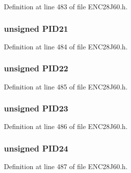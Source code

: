 Definition at line 483 of file E\+N\+C28\+J60.\+h.

\hypertarget{union_p_h_y_r_e_g_af9df143eb7a34477460b417fd088c89c}{}
\subsubsection[{P\+I\+D21}]{\setlength{\rightskip}{0pt plus 5cm}unsigned P\+I\+D21}\label{union_p_h_y_r_e_g_af9df143eb7a34477460b417fd088c89c}


Definition at line 484 of file E\+N\+C28\+J60.\+h.

\hypertarget{union_p_h_y_r_e_g_a57969a4017c4a47dedb79f0889a12022}{}
\subsubsection[{P\+I\+D22}]{\setlength{\rightskip}{0pt plus 5cm}unsigned P\+I\+D22}\label{union_p_h_y_r_e_g_a57969a4017c4a47dedb79f0889a12022}


Definition at line 485 of file E\+N\+C28\+J60.\+h.

\hypertarget{union_p_h_y_r_e_g_ac07ac2fd372c7542d29a010273f2b8c6}{}
\subsubsection[{P\+I\+D23}]{\setlength{\rightskip}{0pt plus 5cm}unsigned P\+I\+D23}\label{union_p_h_y_r_e_g_ac07ac2fd372c7542d29a010273f2b8c6}


Definition at line 486 of file E\+N\+C28\+J60.\+h.

\hypertarget{union_p_h_y_r_e_g_a381d146760b448eb17b40aa0f4ba265f}{}
\subsubsection[{P\+I\+D24}]{\setlength{\rightskip}{0pt plus 5cm}unsigned P\+I\+D24}\label{union_p_h_y_r_e_g_a381d146760b448eb17b40aa0f4ba265f}


Definition at line 487 of file E\+N\+C28\+J60.\+h.

